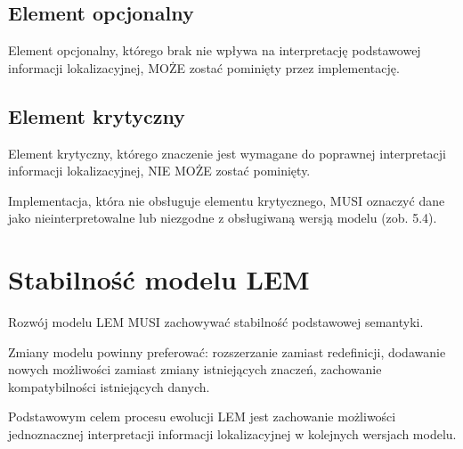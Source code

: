 \subsection{Element opcjonalny}
Element opcjonalny, którego brak nie wpływa na interpretację podstawowej informacji lokalizacyjnej, MOŻE zostać pominięty przez implementację.

\subsection{Element krytyczny}
Element krytyczny, którego znaczenie jest wymagane do poprawnej interpretacji informacji lokalizacyjnej, NIE MOŻE zostać pominięty.

Implementacja, która nie obsługuje elementu krytycznego, MUSI oznaczyć dane jako nieinterpretowalne lub niezgodne z obsługiwaną wersją modelu (zob. 5.4).

\section{Stabilność modelu LEM}
Rozwój modelu LEM MUSI zachowywać stabilność podstawowej semantyki.

Zmiany modelu powinny preferować: rozszerzanie zamiast redefinicji, dodawanie nowych możliwości zamiast zmiany istniejących znaczeń, zachowanie kompatybilności istniejących danych.

Podstawowym celem procesu ewolucji LEM jest zachowanie możliwości jednoznacznej interpretacji informacji lokalizacyjnej w kolejnych wersjach modelu.